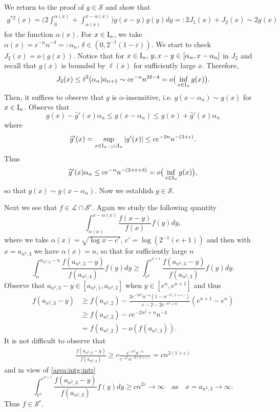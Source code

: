 \documentclass[12pt,leqno]{amsart}
\newcommand{\rI}{{\rm I}}
\newcommand{\wh}{\widehat}
\newcommand{\vep}{\varepsilon}
\newcommand{\cals}{{\mathcal S}}
\newcommand{\call}{{\mathcal L}}
\newcommand{\1}{{\mathbf 1}}
\begin{document}
We return to the proof of $g\in \cals$ and show that %
\begin{align*}
 g^{\ast 2}(x)= \Big(
2 \int_{0}^{\alpha(x)} +\int_{\alpha(x)}^{x-\alpha(x)} 
\Big) g(x-y)g(y)dy =:2J_1(x) + J_2(x) \sim 2 g(x)
\end{align*}
for the function $\alpha(x)$. 
For $x\in \rI_n$, we take $\alpha(x)=e^{-n}n^{-\delta}=:\alpha_n,\,\delta\in (0,2^{-1}(1-\vep))$. 
We start to check $J_2(x)=o(g(x))$. Notice that for $x\in \rI_n,\,y,x-y\in [\alpha_n,x-\alpha_n]$ in $J_2$ and recall that  
$g(x)$ is bounded by $\ell(x)$ for sufficiently large $x$. Therefore,  
\begin{align*}
 J_2(x) \le \ell^2(\alpha_n) a_{n+1} \sim ce^{-n} n^{2\delta -4}=o\big(
\inf_{x\in \rI_n} g(x)
\big).
\end{align*}
Then, it suffices to observe that $g$ is $\alpha$-insensitive, i.e. $g(x-\alpha_n)\sim g(x)$ for $x\in \rI_n$. 
Observe that 
\[
 g(x)-\wh g'(x)\alpha_n \le g(x-\alpha_n) \le g(x)+\wh g'(x)\alpha_n 
\]
where 
\[
 \wh g'(x) = \sup_{x\in \rI_{n-1}\cup \rI_n} |g'(x)| \le ce^{-2 n}n^{-(3+\vep)}. 
\]
Thus 
\begin{align*}
 \wh g'(x) \alpha_n \le c e^{-n} n^{-(3+\vep+\delta)} =o\big(
\inf_{x\in \rI_n}g(x)
\big), 
\end{align*}
so that $g(x)\sim g(x-\alpha_n)$. Now we establish $g\in \cals$. 


Next we see that $f\in \call\cap \cals^c$. 
Again we study the following quantity 
\[
 \int_{\alpha(x)}^{x-\alpha(x)} \frac{f(x-y)}{f(x)}f(y)dy,
\]
where we take $\alpha(x)=\sqrt{\log x-c'},\,c'=\log(2^{-1}(e+1))$ and 
then with $x=a_{n^2,3}$ we  have $\alpha(x)=n$, so that for sufficiently large $n$
\[
 \int_{n}^{\alpha_{n^2,3}-n} \frac{f(a_{n^2,3}-y)}{f(a_{n^2,3})}f(y)dy \ge \int_{e^n}^{e^{n+1}} 
\frac{f(a_{n^2,3}-y)}{f(a_{n^2,3})}f(y)dy. 
\]
Observe that $a_{n^2,3}-y\in [a_{n^2,1},a_{n^2,2}]$ when $y\in [e^{n},e^{n+1}]$ and thus 
\begin{align*}
 f(a_{n^2,3}-y) &\ge f(a_{n^2,2}) - \frac{2e^{-2n^2}n^{-4} (1-n^{-2(1+\vep)})}{e-2-2e^{-n^2+n}}(e^{n+1}-e^n) \\
& \ge f(a_{n^2,2}) -c e^{-2n^2+n}n^{-4} \\
& = f(a_{n^2,2}) -o(f(a_{n^2,3})).
\end{align*}
It is not difficult to observe that 
\begin{align*}
 \frac{f(a_{n^2,3}-y)}{f(a_{n^2,3})} \ge c \frac{ e^{-n^2}n^{-4}}{e^{-n^2}n^{-2(3+\vep)}} = c n^{2(1+\vep)}
\end{align*}
and in view of \eqref{area:intg:intr} 
\[
 \int_{e^n}^{e^{n+1}} \frac{f(a_{n^2,3}-y)}{f(a_{n^2,3})}f(y)dy \ge cn^{2\vep} \to \infty\quad \text{as}\quad x=a_{n^2,3}\to\infty.
\]
Thus $f\in\cals^c$. 
\end{document}
